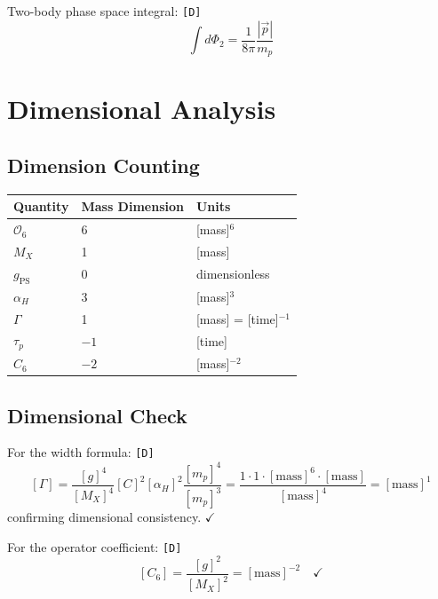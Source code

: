 \documentclass[11pt,a4paper]{article}
\newcommand{\tagD}{\textcolor{green!50!black}{\texttt{[D]}}}
\theoremstyle{definition}
\begin{document}
Two-body phase space integral: \tagD{}
\begin{equation}
\label{eq:ps-integral}
\int d\Phi_2 = \frac{1}{8\pi} \frac{|\vec{p}|}{m_p}
\end{equation}

\section{Dimensional Analysis}
\label{app:dimensional}

\subsection{Dimension Counting}
\label{app:dimensions}

\begin{center}
\begin{tabular}{lll}
\toprule
Quantity & Mass Dimension & Units \\
\midrule
$\mathcal{O}_6$ & 6 & [mass]$^6$ \\
$M_X$ & 1 & [mass] \\
$g_{\text{PS}}$ & 0 & dimensionless \\
$\alpha_H$ & 3 & [mass]$^3$ \\
$\Gamma$ & 1 & [mass] = [time]$^{-1}$ \\
$\tau_p$ & $-1$ & [time] \\
$C_6$ & $-2$ & [mass]$^{-2}$ \\
\bottomrule
\end{tabular}
\end{center}

\subsection{Dimensional Check}
\label{app:dim-check}

For the width formula: \tagD{}
\begin{equation}
\label{eq:dim-check}
[\Gamma] = \frac{[g]^4}{[M_X]^4} [C]^2 [\alpha_H]^2 \frac{[m_p]^4}{[m_p]^3}
= \frac{1 \cdot 1 \cdot [\text{mass}]^6 \cdot [\text{mass}]}{[\text{mass}]^4} = [\text{mass}]^1
\end{equation}
confirming dimensional consistency. $\checkmark$

For the operator coefficient: \tagD{}
\begin{equation}
\label{eq:dim-check-c6}
[C_6] = \frac{[g]^2}{[M_X]^2} = [\text{mass}]^{-2} \quad \checkmark
\end{equation}
\end{document}
